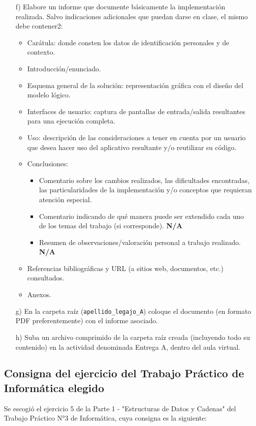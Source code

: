 \documentclass[a4paper,12pt]{article}
\begin{document}
\begin{itemize}
    \item[f)] Elabore un informe que documente básicamente la implementación realizada. Salvo
    indicaciones adicionales que puedan darse en clase, el mismo debe contener2:
    \begin{itemize}
        \item Carátula: donde consten los datos de identificación personales y de contexto.
        \item Introducción/enunciado.
        \item Esquema general de la solución: representación gráfica con el diseño del modelo lógico.
        \item Interfaces de usuario: captura de pantallas de entrada/salida resultantes para una ejecución completa.
        \item Uso: descripción de las consideraciones a tener en cuenta por un usuario que desea hacer uso del aplicativo resultante y/o reutilizar su código.
        \item Conclusiones:
        \begin{itemize}
            \item Comentario sobre los cambios realizados, las dificultades encontradas, las particularidades de la implementación y/o conceptos que requieran atención especial.
            \item Comentario indicando de qué manera puede ser extendido cada uno de los temas del trabajo (si corresponde). \textbf{N/A}
            \item Resumen de observaciones/valoración personal a trabajo realizado. \textbf{N/A}
        \end{itemize}
        \item Referencias bibliográficas y URL (a sitios web, documentos, etc.) consultados.
        \item Anexos.
    \end{itemize}
    
    \item[g)] En la carpeta raíz (\texttt{apellido\_legajo\_A}) coloque el documento (en formato PDF preferentemente) con el informe asociado.
    
    \item[h)] Suba un archivo comprimido de la carpeta raíz creada (incluyendo todo su contenido) en la actividad denominada Entrega A, dentro del aula virtual.
\end{itemize}

\subsection{Consigna del ejercicio del Trabajo Práctico de Informática elegido}
Se escogió el ejercicio 5 de la Parte 1 - "Estructuras de Datos y Cadenas" del Trabajo Práctico N°3 de Informática, cuya consigna es la siguiente:
\end{document}
